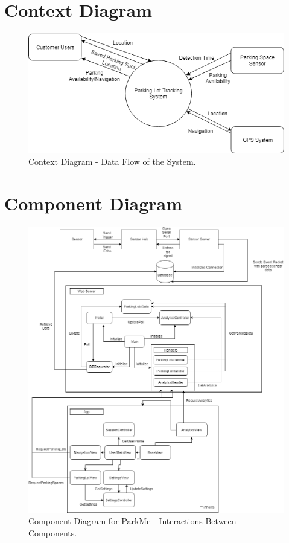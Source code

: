 \documentclass[]{article}
\begin{document}
	\section{Context Diagram}
	\begin{figure}[H]
		\centering
		\includegraphics[width=40em]{ContextDiagram.png}
		\caption{Context Diagram - Data Flow of the System.}
		\label{fig:cd}
	\end{figure}
	\section{Component Diagram}
	\begin{figure}[H]
		\centering
		\includegraphics[width=40em]{Images/ComponentDiagram.png}
		\caption{Component Diagram for ParkMe - Interactions Between Components.}
		\label{fig:cmd}
	\end{figure}
\end{document}
